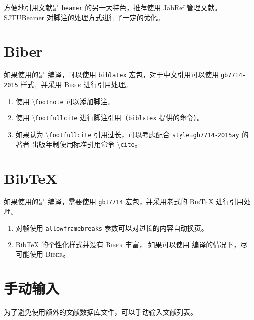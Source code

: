 \documentclass[
    UTF8,
    heading=true,
    12pt,
    a4paper
]{ctexrep}
\newenvironment{commentlist}
{\begin{enumerate}\small}
{\end{enumerate}}
\newcommand{\cmd}[1]{\textbackslash{}\texttt{#1}}
\newcommand{\cls}[1]{\texttt{#1}}
\newcommand{\pkg}[1]{\texttt{#1}}
\newcommand{\opt}[1]{\texttt{#1}}
\def\themename{\textsf{SJTUBeamer}}
\begin{document}
方便地引用文献是 \cls{beamer} 的另一大特色，推荐使用
\href{https://www.jabref.org/}{JabRef}
管理文献。\themename{} 对脚注的处理方式进行了一定的优化。

\section{Biber}

\faApple{} \faLinux{} 如果使用的是 
编译，可以使用 \pkg{biblatex} 宏包，对于中文引用可以使用
\opt{gb7714-2015} 样式，并采用 \textsc{Biber} 进行引用处理。


\begin{commentlist}
  \item 使用 \cmd{footnote} 可以添加脚注。
  \item 使用 \cmd{footfullcite}
  进行脚注引用（\pkg{biblatex} 提供的命令）。
  \item 如果认为 \cmd{footfullcite} 引用过长，可以考虑配合
  \opt{style=gb7714-2015ay} 的著者-出版年制使用标准引用命令
  \cmd{cite}。
\end{commentlist}

\section{Bib\TeX{}}

\faWindows 如果使用的是  编译，需要使用
\pkg{gbt7714} 宏包，并采用老式的 \textsc{Bib\TeX{}}
进行引用处理。


\begin{commentlist}
  \item 对帧使用 \verb"allowframebreaks"
  参数可以对过长的内容自动换页。
  \item Bib\TeX{} 的个性化样式并没有 \textsc{Biber} 丰富， 如果可以使用  编译的情况下，尽可能使用
  \textsc{Biber}。
\end{commentlist}

\section{手动输入}

为了避免使用额外的文献数据库文件，可以手动输入文献列表。

\end{document}
